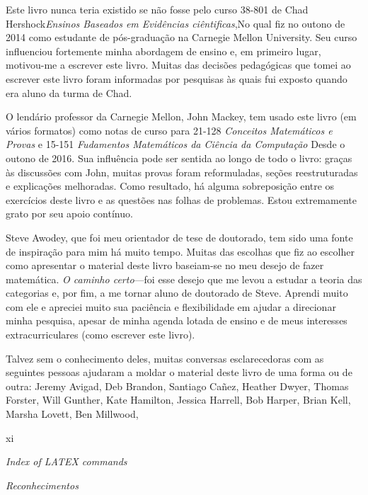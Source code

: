 \documentclass[
]{article}
\begin{document}
Este livro nunca teria existido se não fosse pelo curso 38-801 de Chad
Hershock\emph{Ensinos Baseados em Evidências ciêntificas},No qual fiz no
outono de 2014 como estudante de pós-graduação na Carnegie Mellon
University. Seu curso influenciou fortemente minha abordagem de ensino
e, em primeiro lugar, motivou-me a escrever este livro. Muitas das
decisões pedagógicas que tomei ao escrever este livro foram informadas
por pesquisas às quais fui exposto quando era aluno da turma de Chad.

O lendário professor da Carnegie Mellon, John Mackey, tem usado este
livro (em vários formatos) como notas de curso para 21-128
\emph{Conceitos Matemáticos e Provas} e 15-151 \emph{Fudamentos
Matemáticos da Ciência da Computação} Desde o outono de 2016. Sua
influência pode ser sentida ao longo de todo o livro: graças às
discussões com John, muitas provas foram reformuladas, seções
reestruturadas e explicações melhoradas. Como resultado, há alguma
sobreposição entre os exercícios deste livro e as questões nas folhas de
problemas. Estou extremamente grato por seu apoio contínuo.

Steve Awodey, que foi meu orientador de tese de doutorado, tem sido uma
fonte de inspiração para mim há muito tempo. Muitas das escolhas que fiz
ao escolher como apresentar o material deste livro baseiam-se no meu
desejo de fazer matemática. \emph{O caminho certo}---foi esse desejo que
me levou a estudar a teoria das categorias e, por fim, a me tornar aluno
de doutorado de Steve. Aprendi muito com ele e apreciei muito sua
paciência e flexibilidade em ajudar a direcionar minha pesquisa, apesar
de minha agenda lotada de ensino e de meus interesses extracurriculares
(como escrever este livro).

Talvez sem o conhecimento deles, muitas conversas esclarecedoras com as
seguintes pessoas ajudaram a moldar o material deste livro de uma forma
ou de outra: Jeremy Avigad, Deb Brandon, Santiago Cañez, Heather Dwyer,
Thomas Forster, Will Gunther, Kate Hamilton, Jessica Harrell, Bob
Harper, Brian Kell, Marsha Lovett, Ben Millwood,

xi

\emph{Index of LATEX commands}

\emph{Reconhecimentos}
\end{document}
